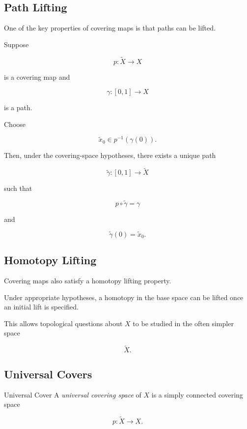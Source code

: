 \subsection{Path Lifting}
\label{subsec:path-lifting}

One of the key properties of covering maps is that paths can be lifted.

Suppose

\[
p:\widetilde{X}\to X
\]

is a covering map and

\[
\gamma:[0,1]\to X
\]

is a path.

Choose

\[
\widetilde{x}_0\in p^{-1}(\gamma(0)).
\]

Then, under the covering-space hypotheses, there exists a unique path

\[
\widetilde{\gamma}:[0,1]\to\widetilde{X}
\]

such that

\[
\boxed{
p\circ\widetilde{\gamma}
=
\gamma
}
\]

and

\[
\widetilde{\gamma}(0)=\widetilde{x}_0.
\]

\subsection{Homotopy Lifting}
\label{subsec:homotopy-lifting}

Covering maps also satisfy a homotopy lifting property.

Under appropriate hypotheses, a homotopy in the base space can be lifted
once an initial lift is specified.

This allows topological questions about \(X\) to be studied in the often
simpler space

\[
\widetilde{X}.
\]

\subsection{Universal Covers}
\label{subsec:universal-covers}

\begin{definitionbox}{Universal Cover}
A \emph{universal covering space} of \(X\) is a simply connected covering
space

\[
\boxed{
p:\widetilde{X}\to X.
}
\]
\end{definitionbox}

